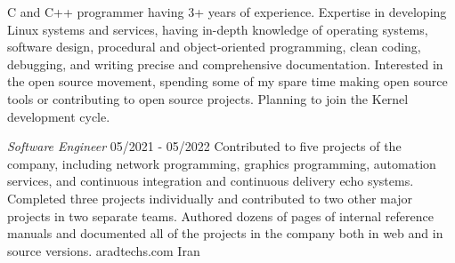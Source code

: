 \documentclass[a4paper,12pt]{memoir} %
\begin{document}
\userinformation %

\framebreak %


\CVDate




{C and C++ programmer having 3+ years of experience. Expertise in developing Linux systems and services, having in-depth knowledge of operating systems, software design, procedural and object-oriented programming, clean coding, debugging, and writing precise and comprehensive documentation. Interested in the open source movement, spending some of my spare time making open source tools or contributing to open source projects. Planning to join the Kernel development cycle.}


\SmallSep %




{\textit{Software Engineer}}
{05/2021 - 05/2022}
{Contributed to five projects of the company, including network programming, graphics programming, automation services, and continuous integration and continuous delivery echo systems.
Completed three projects individually and contributed to two other major projects in two separate teams.
Authored dozens of pages of internal reference manuals and documented all of the projects in the company both in web and in source versions.}
{aradtechs.com}
{Iran}

\end{document}
